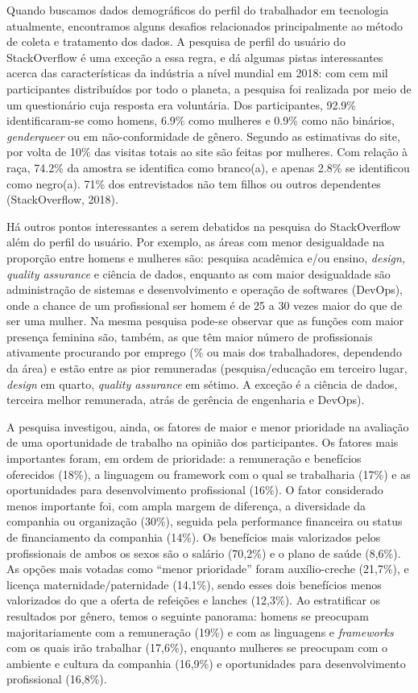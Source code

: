Quando buscamos dados demográficos do perfil do trabalhador em tecnologia atualmente, encontramos alguns desafios relacionados principalmente ao método de coleta e tratamento dos dados. A pesquisa de perfil do usuário do StackOverflow é uma exceção a essa regra, e dá algumas pistas interessantes acerca das características da indústria a nível mundial em 2018: com cem mil participantes distribuídos por todo o planeta, a pesquisa foi realizada por meio de um questionário cuja resposta era voluntária. Dos participantes, 92.9\% identificaram-se como homens, 6.9\% como mulheres e 0.9\% como não binários, \textit{genderqueer} ou em não-conformidade de gênero. Segundo as estimativas do site, por volta de 10\% das visitas totais ao site são feitas por mulheres. Com relação à raça, 74.2\% da amostra se identifica como branco(a), e apenas 2.8\% se identificou como negro(a). 71\% dos entrevistados não tem filhos ou outros dependentes (StackOverflow, 2018).

Há outros pontos interessantes a serem debatidos na pesquisa do StackOverflow além do perfil do usuário. Por exemplo, as áreas com menor desigualdade na proporção entre homens e mulheres são: pesquisa acadêmica e/ou ensino, \textit{design, quality assurance} e ciência de dados, enquanto as com maior desigualdade são administração de sistemas e desenvolvimento e operação de softwares (DevOps), onde a chance de um profissional ser homem é de 25 a 30 vezes maior do que de ser uma mulher. Na mesma pesquisa pode-se observar que as funções com maior presença feminina são, também, as que têm maior número de profissionais ativamente procurando por emprego (\% ou mais dos trabalhadores, dependendo da área) e estão entre as pior remuneradas (pesquisa/educação em terceiro lugar, \textit{design} em quarto, \textit{quality assurance} em sétimo. A exceção é a ciência de dados, terceira melhor remunerada, atrás de gerência de engenharia e DevOps).

A pesquisa investigou, ainda, os fatores de maior e menor prioridade na avaliação de uma oportunidade de trabalho na opinião dos participantes. Os fatores mais importantes foram, em ordem de prioridade: a remuneração e benefícios oferecidos (18\%), a linguagem ou framework com o qual se trabalharia (17\%) e as oportunidades para desenvolvimento profissional (16\%). O fator considerado menos importante foi, com ampla margem de diferença, a diversidade da companhia ou organização (30\%), seguida pela performance financeira ou status de financiamento da companhia (14\%). Os benefícios mais valorizados pelos profissionais de ambos os sexos são o salário (70,2\%) e o plano de saúde (8,6\%). As opções mais votadas como “menor prioridade” foram auxílio-creche (21,7\%), e licença maternidade/paternidade (14,1\%), sendo esses dois benefícios menos valorizados do que a oferta de refeições e lanches (12,3\%). Ao estratificar os resultados por gênero, temos o seguinte panorama: homens se preocupam majoritariamente com a remuneração (19\%) e com as linguagens e \textit{frameworks} com os quais irão trabalhar (17,6\%), enquanto mulheres se preocupam com o ambiente e cultura da companhia (16,9\%) e oportunidades para desenvolvimento profissional (16,8\%). 

